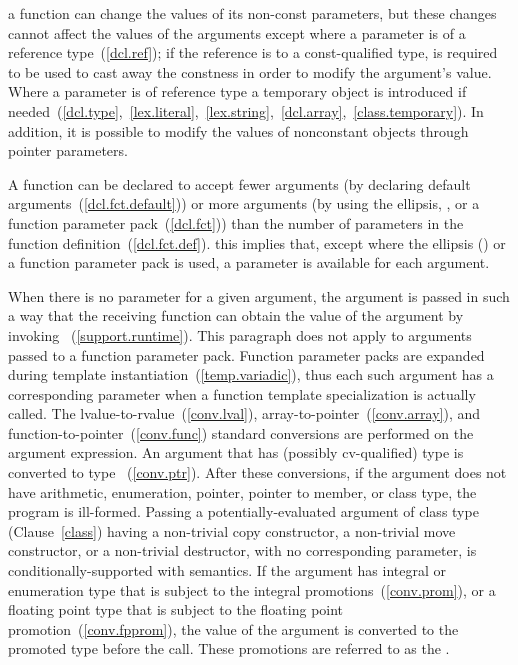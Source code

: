 \pnum
\enternote 
{}%
%
%
%
%
%
a function can change the values of its non-const parameters, but these
changes cannot affect the values of the arguments except where a
parameter is of a reference type~(\ref{dcl.ref}); if the reference is to
a const-qualified type,  is required to be used to
cast away the constness in order to modify the argument's value. Where a
parameter is of  reference type a temporary object is
introduced if
needed~(\ref{dcl.type},~\ref{lex.literal},~\ref{lex.string},~\ref{dcl.array},~\ref{class.temporary}).
In addition, it is possible to modify the values of nonconstant objects through
pointer parameters.
\exitnote 

\pnum
{}%
%
A function can be declared to accept fewer arguments (by declaring default
arguments~(\ref{dcl.fct.default})) or more arguments (by using the ellipsis,
, or a function parameter pack~(\ref{dcl.fct})) than the number of
parameters in the function definition~(\ref{dcl.fct.def}).
\enternote 
this implies that, except where the ellipsis () or a function
parameter pack is used, a parameter is available for each argument.
\exitnote 

\pnum
{}%
When there is no parameter for a given argument, the argument is passed
in such a way that the receiving function can obtain the value of the
argument by invoking ~(\ref{support.runtime}).
\enternote This paragraph does not apply to arguments passed to a function parameter pack.
Function parameter packs are expanded during template instantiation~(\ref{temp.variadic}),
thus each such argument has a corresponding parameter when a function template
specialization is actually called. \exitnote
The
lvalue-to-rvalue~(\ref{conv.lval}), array-to-pointer~(\ref{conv.array}),
and function-to-pointer~(\ref{conv.func}) standard conversions are
performed on the argument expression.
An argument that has (possibly cv-qualified) type  is converted
to type ~(\ref{conv.ptr}).
After these conversions, if the
argument does not have arithmetic, enumeration, pointer, pointer to
member, or class type, the program is ill-formed. Passing a potentially-evaluated
argument of class type (Clause~\ref{class}) having a non-trivial
copy constructor, a non-trivial move constructor,
or a
non-trivial destructor, with no corresponding parameter, is conditionally-supported with
 semantics. If the argument has
integral or enumeration type that is subject to the integral
promotions~(\ref{conv.prom}), or a floating point type that is subject to the floating
point promotion~(\ref{conv.fpprom}), the value of the argument is converted to the
promoted type before the call. These promotions are referred to as the .

